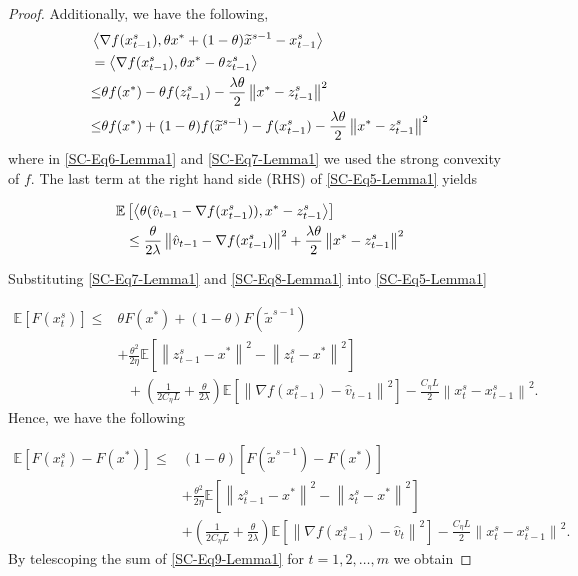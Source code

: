 \documentclass{article}
\newcommand*{\E}{\mathbb{E}}
\newcommand{\norm}[1]{\left\lVert#1\right\rVert}
\newcommand{\Iprod}[2]{\left\langle #1,#2\right\rangle}
\theoremstyle{definition}
\theoremstyle{remark}
\begin{document}
{{\begin{proof}
Additionally, we have the following,
\begin{align}
&\Iprod{\nabla f(x_{t-1}^s)}{\theta x^*+(1-\theta)\widetilde{x}^{s-1}-{x}^{s}_{t-1}}\notag\\
&= \Iprod{\nabla f(x_{t-1}^s)}{\theta x^*-\theta{z}^{s}_{t-1}}\notag\\
&{\leq} \theta f(x^*)-\theta f(z_{t-1}^s)-\frac{\lambda\theta}{2}\norm{x^*-z_{t-1}^s}^2\label{SC-Eq6-Lemma1}\\
&{\leq} \theta f(x^*)+(1-\theta)f(\widetilde{x}^{s-1})-f(x_{t-1}^s)-\frac{\lambda\theta}{2}\norm{x^*-z_{t-1}^s}^2\label{SC-Eq7-Lemma1}
\end{align}
where in \eqref{SC-Eq6-Lemma1} and \eqref{SC-Eq7-Lemma1} we used the strong convexity of $f$. The last term at the right hand side (RHS) of \eqref{SC-Eq5-Lemma1} yields

\begin{align}
\E&\left[\Iprod{\theta(\hat{v}_{t-1}-\nabla f(x_{t-1}^s))}{x^* - z_{t-1}^s}\right]\notag \\
&\leq \frac{\theta}{2\lambda} \norm{\hat{v}_{t-1}-\nabla f(x_{t-1}^s)}^2+\frac{\lambda\theta}{2}\norm{x^* - z_{t-1}^s}^2\label{SC-Eq8-Lemma1}
\end{align}

Substituting \eqref{SC-Eq7-Lemma1} and \eqref{SC-Eq8-Lemma1} into \eqref{SC-Eq5-Lemma1}

\begin{equation}
\begin{split}
\E[F(x_{t}^s)] \leq &\theta F(x^*)+(1-\theta)F(\widetilde{x}^{s-1})\\
&+ {\frac{\theta^2}{2\eta}}\E[\norm{z_{t-1}^s-x^*}^2-\norm{z_{t}^s-x^*}^2]\\
&~~~+(\frac{1}{2C_{\eta} L}+\frac{\theta}{2\lambda})\E\left[\norm{\nabla f(x_{t-1}^s)-\hat{v}_{t-1}}^2\right]-\frac{C_{\eta} L}{2}\norm{x_{t}^s-x_{t-1}^s}^2. 
\end{split}
\end{equation}
Hence, we have the following

\begin{equation}\label{SC-Eq9-Lemma1}
\begin{split}
\E[F(x_{t}^s)-F(x^*)] \leq &(1-\theta)[F(\widetilde{x}^{s-1})-F(x^*)] \\
&+ {\frac{ \theta^2}{2\eta}}\E[\norm{z_{t-1}^s-x^*}^2-\norm{z_{t}^s-x^*}^2]\\
&+(\frac{1}{2C_{\eta} L}+\frac{\theta}{2\lambda})\E\left[\norm{\nabla f(x_{t-1}^s)-\hat{v}_{t}}^2\right]-\frac{C_{\eta} L}{2}\norm{x_{t}^s-x_{t-1}^s}^2. 
\end{split}
\end{equation}
By telescoping the sum of \eqref{SC-Eq9-Lemma1} for $t = 1, 2, \ldots, m$ we obtain


\end{proof}}}
\end{document}
